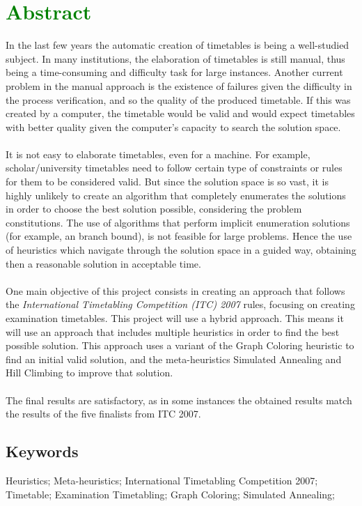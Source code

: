 \chapter*{\textcolor{green}{Abstract}}

In the last few years the automatic creation of timetables is being a well-studied subject. In many institutions, the elaboration of timetables is still manual, thus being a time-consuming and difficulty task for large instances. Another current problem in the manual approach is the existence of failures given the difficulty in the process verification, and so the quality of the produced timetable. If this was created by a computer, the timetable would be valid and would expect timetables with better quality given the computer's capacity to search the solution space. \\
\\
It is not easy to elaborate timetables, even for a machine. For example, scholar/university timetables need to follow certain type of constraints or rules for them to be considered valid. But since the solution space is so vast, it is highly unlikely to create an algorithm that completely enumerates the solutions in order to choose the best solution possible, considering the problem constitutions. The use of algorithms that perform implicit enumeration solutions (for example, an branch bound), is not feasible for large problems. Hence the use of heuristics which navigate through the solution space in a guided way, obtaining then a reasonable solution in acceptable time.\\
\\
One main objective of this project consists in creating an approach that follows the \textit{International Timetabling Competition (ITC) 2007} rules, focusing on creating examination timetables. This project will use a hybrid approach. This means it will use an approach that includes multiple heuristics in order to find the best possible solution. This approach uses a variant of the Graph Coloring heuristic to find an initial valid solution, and the meta-heuristics Simulated Annealing and Hill Climbing to improve that solution.\\
\\
The final results are satisfactory, as in some instances the obtained results match the results of the five finalists from ITC 2007.


\section*{Keywords}

Heuristics; Meta-heuristics; International Timetabling Competition 2007; Timetable; Examination Timetabling; Graph Coloring; Simulated Annealing;

